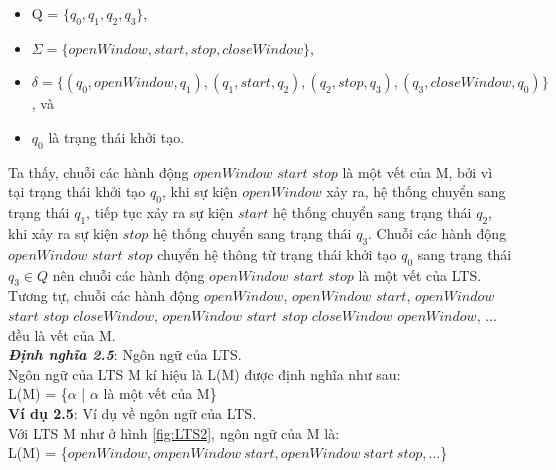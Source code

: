 \documentclass[a4paper,13pt,oneside,openany]{book}
\begin{document}
\begin{flushleft}
		\begin{itemize}
			\item Q = $\{q_0, q_1, q_2, q_3\}$,
			\item $\Sigma = \{openWindow, start, stop, closeWindow\}$,
			\item $\delta = \{(q_0, openWindow, q_1), (q_1, start, q_2), (q_2, stop, q_3), (q_3, closeWindow, q_0)\}$, và
			\item $q_0$ là trạng thái khởi tạo.
		\end{itemize}
		Ta thấy, chuỗi các hành động $openWindow$ $start$ $stop$ là một vết của M, bởi vì tại trạng thái khởi tạo $q_0$, khi sự kiện $openWindow$ xảy ra, hệ thống chuyển sang trạng thái $q_1$, tiếp tục xảy ra sự kiện $start$ hệ thống chuyển sang trạng thái $q_2$, khi xảy ra sự kiện $stop$ hệ thống chuyển sang trạng thái $q_3$. Chuỗi các hành động $openWindow$ $start$ $stop$ chuyển hệ thông từ trạng thái khởi tạo $q_0$ sang trạng thái $q_3 \in Q$ nên chuỗi các hành động  $openWindow$ $start$ $stop$ là một vết của LTS. Tương tự, chuỗi các hành động $openWindow$, $openWindow$ $start$, $openWindow$ $start$ $stop$ $closeWindow$, $openWindow$ $start$ $stop$ $closeWindow$ $openWindow$, ... đều là vết của M.\\
		\textbf{\textit{Định nghĩa 2.5}}: Ngôn ngữ của LTS.\\
		Ngôn ngữ của LTS M kí hiệu là L(M) được định nghĩa như sau:\\
		L(M) = \{$\alpha$ | $\alpha$ là một vết của M\}\\
		\textbf{Ví dụ 2.5}: Ví dụ về ngôn ngữ của LTS.\\
		Với LTS M như ở hình \ref{fig:LTS2}, ngôn ngữ của M là:\\
		L(M) = \{$openWindow, onpenWindow\ start, openWindow \ start \ stop, ...$\}

\end{flushleft}
\end{document}
